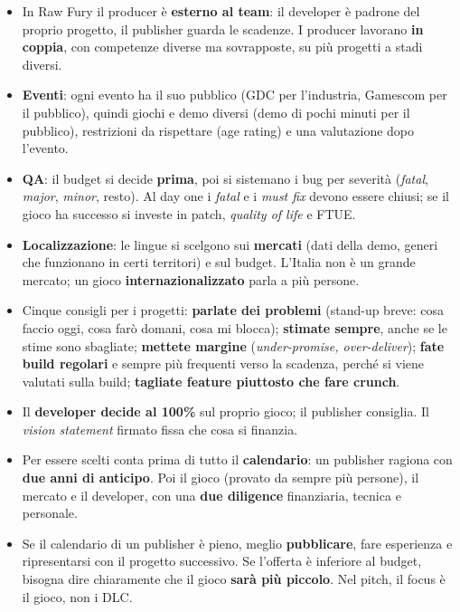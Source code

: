 \begin{itemize}
{        il bisogno}; \textbf{come} risolverlo lo decide l'esperto del reparto.
  \item In Raw Fury il producer è \textbf{esterno al team}: il developer è
        padrone del proprio progetto, il publisher guarda le scadenze. I
        producer lavorano \textbf{in coppia}, con competenze diverse ma
        sovrapposte, su più progetti a stadi diversi.
  \item \textbf{Eventi}: ogni evento ha il suo pubblico (GDC per l'industria,
        Gamescom per il pubblico), quindi giochi e demo diversi (demo di pochi
        minuti per il pubblico), restrizioni da rispettare (age rating) e una
        valutazione dopo l'evento.
  \item \textbf{QA}: il budget si decide \textbf{prima}, poi si sistemano i bug
        per severità (\emph{fatal}, \emph{major}, \emph{minor}, resto). Al day
        one i \emph{fatal} e i \emph{must fix} devono essere chiusi; se il gioco
        ha successo si investe in patch, \emph{quality of life} e FTUE.
  \item \textbf{Localizzazione}: le lingue si scelgono sui \textbf{mercati}
        (dati della demo, generi che funzionano in certi territori) e sul budget.
        L'Italia non è un grande mercato; un gioco
        \textbf{internazionalizzato} parla a più persone.
  \item Cinque consigli per i progetti: \textbf{parlate dei problemi} (stand-up
        breve: cosa faccio oggi, cosa farò domani, cosa mi blocca);
        \textbf{stimate sempre}, anche se le stime sono sbagliate;
        \textbf{mettete margine} (\emph{under-promise, over-deliver});
        \textbf{fate build regolari} e sempre più frequenti verso la scadenza,
        perché si viene valutati sulla build; \textbf{tagliate feature piuttosto
        che fare crunch}.
  \item Il \textbf{developer decide al 100\%} sul proprio gioco; il publisher
        consiglia. Il \emph{vision statement} firmato fissa che cosa si finanzia.
  \item Per essere scelti conta prima di tutto il \textbf{calendario}: un
        publisher ragiona con \textbf{due anni di anticipo}. Poi il gioco
        (provato da sempre più persone), il mercato e il developer, con una
        \textbf{due diligence} finanziaria, tecnica e personale.
  \item Se il calendario di un publisher è pieno, meglio \textbf{pubblicare},
        fare esperienza e ripresentarsi con il progetto successivo. Se l'offerta
        è inferiore al budget, bisogna dire chiaramente che il gioco
        \textbf{sarà più piccolo}. Nel pitch, il focus è il gioco, non i DLC.
\end{itemize}
